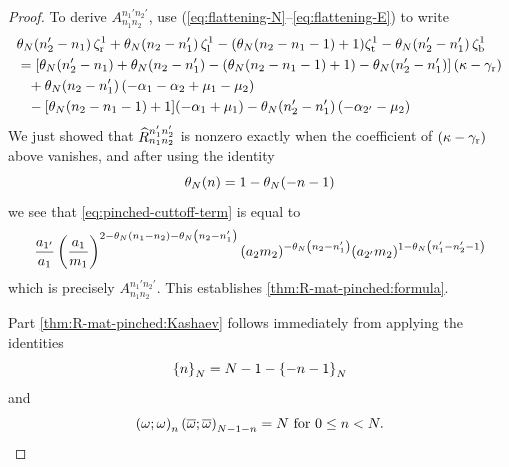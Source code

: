 \documentclass{sl2ams}
\numberwithin{equation}{section}
\begin{document}
\begin{proof}
    To derive \(A_{n_1 n_2}^{n_1' n_2'}\), use (\ref{eq:flattening-N}--\ref{eq:flattening-E}) to write
    \begin{align*}
      &
      \theta_{N}\mathopen{}\left(n_2' -  n_1\right) \zeta_{\mathrm{r}}^1
      +
      \theta_{N}\mathopen{}\left(n_2 -  n_1'\right) \zeta_{\mathrm{l}}^1
      -
      (\theta_{N}\mathopen{}\left(n_2 -  n_1-1\right) + 1) \zeta_{\mathrm{t}}^1
      -
      \theta_{N}\mathopen{}\left(n_2' -  n_1'\right) \zeta_{\mathrm{b}}^1
      \\
      &=
      \left[
        \theta_{N}\mathopen{}\left(n_2' -  n_1\right)
        +
        \theta_{N}\mathopen{}\left(n_2 -  n_1'\right)
        -
        (\theta_{N}\mathopen{}\left(n_2 -  n_1-1\right) + 1)
        -
        \theta_{N}\mathopen{}\left(n_2' -  n_1'\right)
      \right]
      (\kappa - \gamma_{\mathrm{r}})
      \\
      &\phantom{=}+
      \theta_{N}\mathopen{}\left(n_2 -  n_1'\right)(- \alpha_1 - \alpha_2 + \mu_1 - \mu_2)
      \\
      &\phantom{=}-
      [\theta_{N}\mathopen{}\left(n_2 - n_1 - 1\right) + 1](- \alpha_1 + \mu_1)
      -
      \theta_{N}\mathopen{}\left(n_2' - n_1'\right)(-\alpha_{2'} - \mu_2)
    \end{align*}
    We just showed that \(\rmat{n_1}{n_2}{n_1'}{n_2'}\) is nonzero exactly when the coefficient of \((\kappa - \gamma_{\mathrm{r}})\) above vanishes, and after using the identity
    \[
      \theta_{N}\mathopen{}\left(n\right) = 1 - \theta_{N}\mathopen{}\left(-n-1\right)
    \]
    we see that \eqref{eq:pinched-cuttoff-term} is equal to
    \[
      \frac{a_{1'}}{a_1}
      \left( \frac{a_1}{ m_1} \right)^{2 - \theta_{N}\mathopen{}\left(n_1 - n_2\right) - \theta_{N}\mathopen{}\left(n_2 - n_1'\right)}
      (a_2 m_2)^{- \theta_{N}\mathopen{}\left(n_2 - n_1'\right)}
      (a_{2'} m_2)^{1- \theta_{N}\mathopen{}\left(n_1' - n_2' - 1\right)}
    \]
    which is precisely \(A_{n_1 n_2}^{n_1' n_2'}\).
    This establishes \ref{thm:R-mat-pinched:formula}.
  
    Part \ref{thm:R-mat-pinched:Kashaev} follows immediately from applying the identities
    \[
      \left\{n\right\}_{N} = N - 1 - \left\{-n - 1\right\}_{N}
    \]
    and
    \[
      \qp{\omega}{n}
      \qp{\overline{\omega}}[\overline{\omega}]{\nr - 1 - n}
      =
      \nr
      \text{ for }
      0 \le n < \nr.
      \qedhere
    \]
\end{proof}
\end{document}
